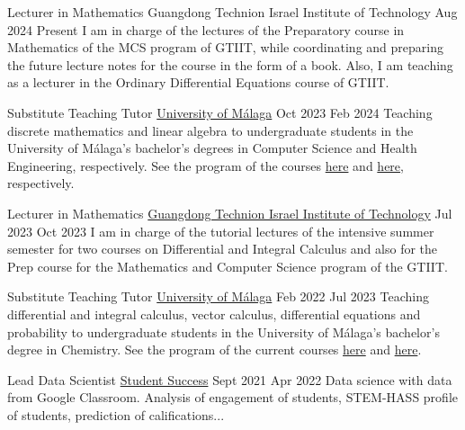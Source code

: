 \nopagebreak
\begin{employment}
		{Lecturer in Mathematics}
		{Guangdong Technion Israel Institute of Technology}
		{Aug 2024}
		{Present}
		{I am in charge of the lectures of the Preparatory course in Mathematics of the MCS program of GTIIT, while coordinating and preparing the future lecture notes for the course in the form of a book. Also, I am teaching as a lecturer in the Ordinary Differential Equations course of GTIIT.}
\end{employment}


\begin{employment}
    {Substitute Teaching Tutor}
    {\href{https://www.uma.es/}{University of Málaga}}
    {Oct 2023}
    {Feb 2024}
    {Teaching discrete mathematics and linear algebra to undergraduate students in the University of Málaga's bachelor's degrees in Computer Science and Health Engineering, respectively. See the program of the courses \href{https://sara.uma.es/ht/2023/ProgramasAsignaturas_Titulacion_5389_AsigUMA_55366.pdf}{here} and \href{https://sara.uma.es/ht/2023/ProgramasAsignaturas_Titulacion_5157_AsigUMA_53012.pdf}{here}, respectively.}
\end{employment}

\begin{employment}
		{Lecturer in Mathematics}
		{\href{https://www.gtiit.edu.cn/en/}{Guangdong Technion Israel Institute of Technology}}
		{Jul 2023}
		{Oct 2023}
		{I am in charge of the tutorial lectures of the intensive summer semester for two courses on Differential and Integral Calculus and also for the Prep course for the Mathematics and Computer Science program of the GTIIT.}
\end{employment}

\begin{employment}
    {Substitute Teaching Tutor}
    {\href{https://www.uma.es/}{University of Málaga}}
    {Feb 2022}
    {Jul 2023}
    {Teaching differential and integral calculus, vector calculus, differential equations and probability to undergraduate students in the University of Málaga's bachelor's degree in Chemistry. See the program of the current courses \href{https://oas.sci.uma.es:8443/ht/2022/ProgramasAsignaturas_Titulacion_5004_AsigUMA_51634.pdf}{here} and \href{https://oas.sci.uma.es:8443/ht/2022/ProgramasAsignaturas_Titulacion_5004_AsigUMA_51639.pdf}{here}.}
\end{employment}

\begin{employment}
    {Lead Data Scientist}
    {\href{https://studentsuccess.app/es/}{Student Success}}
    {Sept 2021}
    {Apr 2022}
    {Data science with data from Google Classroom. Analysis of  engagement of students, STEM-HASS profile of students, prediction of  califications...}
\end{employment}

